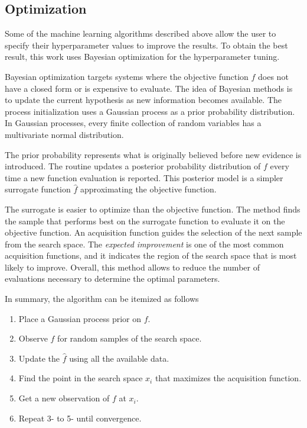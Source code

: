 \subsection{Optimization}
\label{sec:opt}


Some of the machine learning algorithms described above allow the user to specify their hyperparameter values to improve the results.
To obtain the best result, this work uses Bayesian optimization for the hyperparameter tuning.

Bayesian optimization targets systems where the objective function $f$ does not have a closed form or is expensive to evaluate.
The idea of Bayesian methods is to update the current hypothesis as new information becomes available.
The process initialization uses a Gaussian process as a prior probability distribution.
In Gaussian processes, every finite collection of random variables has a multivariate normal distribution.

The prior probability represents what is originally believed before new evidence is introduced.
The routine updates a posterior probability distribution of $f$ every time a new function evaluation is reported.
This posterior model is a simpler surrogate function $\hat{f}$ approximating the objective function. 

The surrogate is easier to optimize than the objective function.
The method finds the sample that performs best on the surrogate function to evaluate it on the objective function.
An acquisition function guides the selection of the next sample from the search space.
The \textit{expected improvement} is one of the most common acquisition functions, and it indicates the region of the search space that is most likely to improve.
Overall, this method allows to reduce the number of evaluations necessary to determine the optimal parameters.

In summary, the algorithm can be itemized as follows
\begin{enumerate}
\item Place a Gaussian process prior on $f$.
\item Observe $f$ for random samples of the search space.
\item Update the $\hat{f}$ using all the available data.
\item Find the point in the search space $x_i$ that maximizes the acquisition function.
\item Get a new observation of $f$ at $x_i$.
\item Repeat 3- to 5- until convergence.
\end{enumerate}

